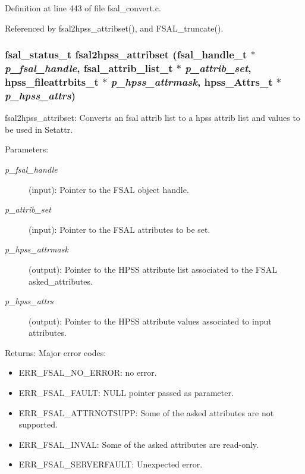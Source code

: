 Definition at line 443 of file fsal\_\-convert.c.

Referenced by fsal2hpss\_\-attribset(), and FSAL\_\-truncate().
\subsubsection{\setlength{\rightskip}{0pt plus 5cm}fsal\_\-status\_\-t fsal2hpss\_\-attribset (fsal\_\-handle\_\-t $\ast$ {\em p\_\-fsal\_\-handle}, fsal\_\-attrib\_\-list\_\-t $\ast$ {\em p\_\-attrib\_\-set}, hpss\_\-fileattrbits\_\-t $\ast$ {\em p\_\-hpss\_\-attrmask}, hpss\_\-Attrs\_\-t $\ast$ {\em p\_\-hpss\_\-attrs})}\label{fsal__convert_8c_a16}


fsal2hpss\_\-attribset: Converts an fsal attrib list to a hpss attrib list and values to be used in Setattr.

\begin{Desc}
\item[Parameters:]
\begin{description}
\item[{\em p\_\-fsal\_\-handle}](input): Pointer to the FSAL object handle. \item[{\em p\_\-attrib\_\-set}](input): Pointer to the FSAL attributes to be set. \item[{\em p\_\-hpss\_\-attrmask}](output): Pointer to the HPSS attribute list associated to the FSAL asked\_\-attributes. \item[{\em p\_\-hpss\_\-attrs}](output): Pointer to the HPSS attribute values associated to input attributes.\end{description}
\end{Desc}
\begin{Desc}
\item[Returns:]Major error codes:\begin{itemize}
\item ERR\_\-FSAL\_\-NO\_\-ERROR: no error.\item ERR\_\-FSAL\_\-FAULT: NULL pointer passed as parameter.\item ERR\_\-FSAL\_\-ATTRNOTSUPP: Some of the asked attributes are not supported.\item ERR\_\-FSAL\_\-INVAL: Some of the asked attributes are read-only.\item ERR\_\-FSAL\_\-SERVERFAULT: Unexpected error.\end{itemize}
\end{Desc}


